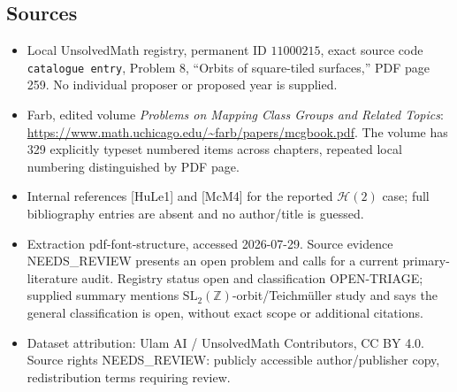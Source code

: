 \documentclass[11pt]{article}
\newcommand{\Z}{\mathbb{Z}}
\begin{document}
\subsection{Sources}
\begin{itemize}
\item Local UnsolvedMath registry, permanent ID \(11000215\), exact source code \texttt{catalogue entry}, Problem 8, ``Orbits of square-tiled surfaces,'' PDF page 259. No individual proposer or proposed year is supplied.
\item Farb, edited volume \emph{Problems on Mapping Class Groups and Related Topics}: \url{https://www.math.uchicago.edu/~farb/papers/mcgbook.pdf}. The volume has 329 explicitly typeset numbered items across chapters, repeated local numbering distinguished by PDF page.
\item Internal references [HuLe1] and [McM4] for the reported \(\mathcal H(2)\) case; full bibliography entries are absent and no author/title is guessed.
\item Extraction pdf-font-structure, accessed 2026-07-29. Source evidence NEEDS\_REVIEW presents an open problem and calls for a current primary-literature audit. Registry status open and classification OPEN-TRIAGE; supplied summary mentions \(\mathrm{SL}_2(\Z)\)-orbit/Teichmüller study and says the general classification is open, without exact scope or additional citations.
\item Dataset attribution: Ulam AI / UnsolvedMath Contributors, CC BY 4.0. Source rights NEEDS\_REVIEW: publicly accessible author/publisher copy, redistribution terms requiring review.
\end{itemize}
\end{document}
